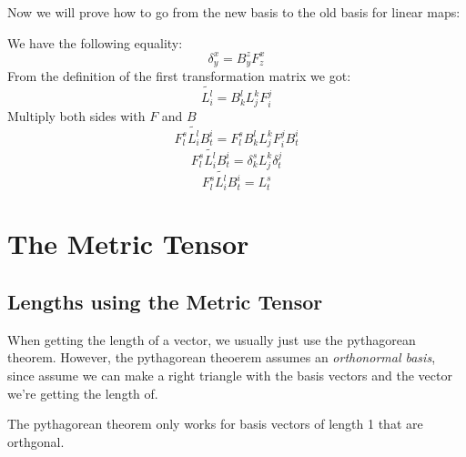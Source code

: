 \documentclass{report}
\begin{document}

\begin{myproof}
	Now we will prove how to go from the new basis to the old basis for linear maps:

	We have the following equality:
	$$ \delta_y^x = B_y^z F_z^x $$ 
	From the definition of the first transformation matrix we got:
	$$ \widetilde{L_i^l} = B_k^l L_j^k F_i^j $$ 
	Multiply both sides with $F$ and $B$
	$$ F_l^s \widetilde{L_i^l} B_t^i = F_l^s B_k^l L_j^k F_i^j B_t^i $$ 
	$$ F_l^s \widetilde{L_i^l} B_t^i = \delta_k^s L_j^k \delta_t^j $$ 
	$$ F_l^s \widetilde{L_i^l} B_t^i =  L_t^s  $$ 
\end{myproof}




\chapter{The Metric Tensor}
\section{Lengths using the Metric Tensor}
When getting the length of a vector, we usually just use the pythagorean theorem. However, the pythagorean theoerem assumes an \emph{orthonormal basis}, since assume we can make a right triangle with the basis vectors and the vector we're getting the length of.

The pythagorean theorem only works for basis vectors of length 1 that are orthgonal.
\end{document}
